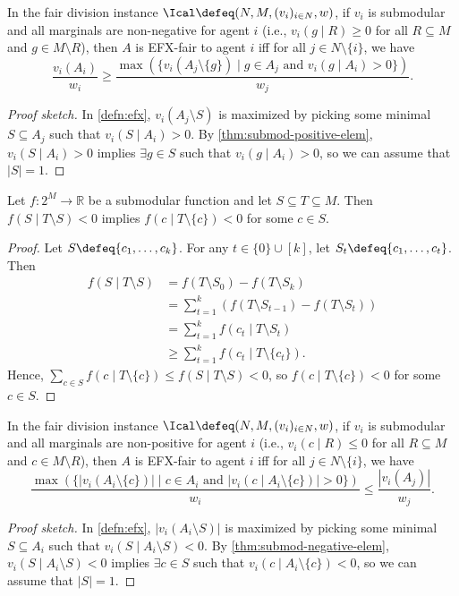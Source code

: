 \begin{lemma}
\label{thm:efx-equiv-submod-goods}
In the fair division instance $\Ical \defeq (N, M, (v_i)_{i \in N}, w)$,
if $v_i$ is submodular and all marginals are non-negative for agent $i$
(i.e., $v_i(g \mid R) \ge 0$ for all $R \subseteq M$ and $g \in M \setminus R$),
then $A$ is EFX-fair to agent $i$ iff for all $j \in N \setminus \{i\}$, we have
\[ \frac{v_i(A_i)}{w_i} \ge \frac{\max(\{v_i(A_j \setminus \{g\})
        \mid g \in A_j \textrm{ and } v_i(g \mid A_i) > 0\})}{w_j}. \]
\end{lemma}
\begin{proof}[Proof sketch]
In \cref{defn:efx}, $v_i(A_j \setminus S)$ is maximized by picking
some minimal $S \subseteq A_j$ such that $v_i(S \mid A_i) > 0$.
By \cref{thm:submod-positive-elem}, $v_i(S \mid A_i) > 0$ implies $\exists g \in S$
such that $v_i(g \mid A_i) > 0$, so we can assume \wLoG{} that $|S| = 1$.
\end{proof}

\begin{lemma}
\label{thm:submod-negative-elem}
Let $f: 2^M \to \mathbb{R}$ be a submodular function and let $S \subseteq T \subseteq M$.
Then $f(S \mid T \setminus S) < 0$ implies $f(c \mid T \setminus \{c\}) < 0$ for some $c \in S$.
\end{lemma}
\begin{proof}
Let $S \defeq \{c_1, \ldots, c_k\}$.
For any $t \in \{0\} \cup [k]$, let $S_t \defeq \{c_1, \ldots, c_t\}$. Then
\begin{align*}
f(S \mid T \setminus S) &= f(T \setminus S_0) - f(T \setminus S_k)
\\ &= \sum_{t=1}^k (f(T \setminus S_{t-1}) - f(T \setminus S_t))
\\ &= \sum_{t=1}^k f(c_t \mid T \setminus S_t)
\\ &\ge \sum_{t=1}^k f(c_t \mid T \setminus \{c_t\}).
\end{align*}
Hence, $\sum_{c \in S} f(c \mid T \setminus \{c\}) \le f(S \mid T \setminus S) < 0$,
so $f(c \mid T \setminus \{c\}) < 0$ for some $c \in S$.
\end{proof}

\begin{lemma}
\label{thm:efx-equiv-submod-chores}
In the fair division instance $\Ical \defeq (N, M, (v_i)_{i \in N}, w)$,
if $v_i$ is submodular and all marginals are non-positive for agent $i$
(i.e., $v_i(c \mid R) \le 0$ for all $R \subseteq M$ and $c \in M \setminus R$),
then $A$ is EFX-fair to agent $i$ iff for all $j \in N \setminus \{i\}$, we have
\[ \frac{\max(\{|v_i(A_i \setminus \{c\})| \mid c \in A_i
    \textrm{ and } |v_i(c \mid A_i \setminus \{c\})| > 0\})}{w_i} \le \frac{|v_i(A_j)|}{w_j}. \]
\end{lemma}
\begin{proof}[Proof sketch]
In \cref{defn:efx}, $|v_i(A_i \setminus S)|$ is maximized by picking
some minimal $S \subseteq A_i$ such that $v_i(S \mid A_i \setminus S) < 0$.
By \cref{thm:submod-negative-elem}, $v_i(S \mid A_i \setminus S) < 0$ implies $\exists c \in S$
such that $v_i(c \mid A_i \setminus \{c\}) < 0$, so we can assume \wLoG{} that $|S| = 1$.
\end{proof}

